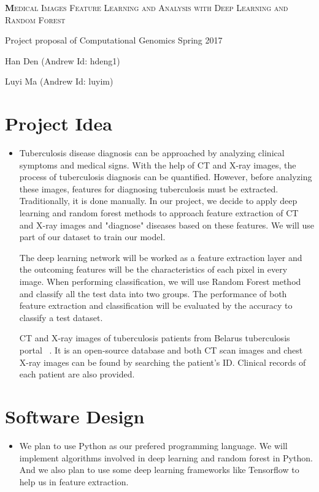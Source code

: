 \documentclass[letterpaper, 12pt]{article}
\begin{document}
\begin{center}
{\Large
	\textsc{\textbf Medical Images Feature Learning and Analysis with Deep Learning and Random Forest}
}

\vspace{0.3cm}

\normalsize Project proposal of Computational Genomics Spring 2017

\vspace{0.5cm}

{\small
	Han Den (Andrew Id: hdeng1)
	
	Luyi Ma (Andrew Id: luyim)
}
\end{center}

\section{Project Idea}

\begin{itemize}
\item
Tuberculosis disease diagnosis can be approached by analyzing clinical symptoms and medical signs. With the help of CT and X-ray images, the process of tuberculosis diagnosis can be quantified. However, before analyzing these images, features for diagnosing tuberculosis must be extracted. Traditionally, it is done manually. In our project, we decide to apply deep learning and random forest methods to approach feature extraction of CT and X-ray images and "diagnose" diseases based on these features. We will use part of our dataset to train our model. 

The deep learning network will be worked as a feature extraction layer and the outcoming features will be the characteristics of each pixel in every image. When performing classification, we will use Random Forest method and classify all the test data into two groups. The performance of both feature extraction and classification will be evaluated by the accuracy to classify a test dataset.

CT and X-ray images of tuberculosis patients from Belarus tuberculosis portal
~\cite{TB_database}.
It is an open-source database and both CT scan images and chest X-ray images can be found by searching the patient's ID. Clinical records of each patient are also provided.
\end{itemize}

\section{Software Design}
\begin{itemize}
\item
We plan to use Python as our prefered programming language. We will implement algorithms involved in deep learning and random forest in Python. And we also plan to use some deep learning frameworks like Tensorflow to help us in feature extraction.

\end{itemize}
\end{document}
